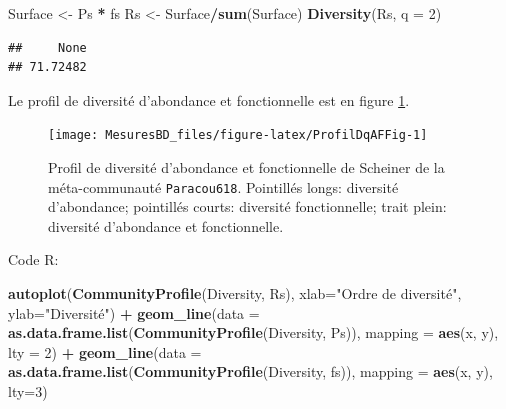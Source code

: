 \documentclass[
  11pt,
  french,
  a4paper,
  extrafontsizes,onecolumn,openright
  ]{memoir}
\newenvironment{Shaded}{\begin{snugshade}}{\end{snugshade}}
\newcommand{\DataTypeTok}[1]{\textcolor[rgb]{0.13,0.29,0.53}{#1}}
\newcommand{\DecValTok}[1]{\textcolor[rgb]{0.00,0.00,0.81}{#1}}
\newcommand{\KeywordTok}[1]{\textcolor[rgb]{0.13,0.29,0.53}{\textbf{#1}}}
\newcommand{\NormalTok}[1]{#1}
\newcommand{\OperatorTok}[1]{\textcolor[rgb]{0.81,0.36,0.00}{\textbf{#1}}}
\newcommand{\StringTok}[1]{\textcolor[rgb]{0.31,0.60,0.02}{#1}}
\newlength{\rf}
\begin{document}
\scriptsize

\begin{Shaded}
\begin{Highlighting}[]
\NormalTok{Surface <-}\StringTok{ }\NormalTok{Ps }\OperatorTok{*}\StringTok{ }\NormalTok{fs}
\NormalTok{Rs <-}\StringTok{ }\NormalTok{Surface}\OperatorTok{/}\KeywordTok{sum}\NormalTok{(Surface)}
\KeywordTok{Diversity}\NormalTok{(Rs, }\DataTypeTok{q =} \DecValTok{2}\NormalTok{)}
\end{Highlighting}
\end{Shaded}

\begin{verbatim}
##     None 
## 71.72482
\end{verbatim}

\normalsize

Le profil de diversité d'abondance et fonctionnelle est en figure \ref{fig:ProfilDqAFFig}.



\scriptsize

\begin{figure}

{\centering \texttt{[image: MesuresBD\_files/figure-latex/ProfilDqAFFig-1]} 

}

\caption{Profil de diversité d'abondance et fonctionnelle de Scheiner de la méta-communauté \texttt{Paracou618}. Pointillés longs: diversité d'abondance; pointillés courts: diversité fonctionnelle; trait plein: diversité d'abondance et fonctionnelle.}\label{fig:ProfilDqAFFig}
\end{figure}

\normalsize

Code R:

\scriptsize

\begin{Shaded}
\begin{Highlighting}[]
\KeywordTok{autoplot}\NormalTok{(}\KeywordTok{CommunityProfile}\NormalTok{(Diversity, Rs), }
         \DataTypeTok{xlab=}\StringTok{"Ordre de diversité"}\NormalTok{, }\DataTypeTok{ylab=}\StringTok{"Diversité"}\NormalTok{) }\OperatorTok{+}
\KeywordTok{geom_line}\NormalTok{(}\DataTypeTok{data =} \KeywordTok{as.data.frame.list}\NormalTok{(}\KeywordTok{CommunityProfile}\NormalTok{(Diversity, Ps)), }
          \DataTypeTok{mapping =} \KeywordTok{aes}\NormalTok{(x, y), }\DataTypeTok{lty =} \DecValTok{2}\NormalTok{) }\OperatorTok{+}
\KeywordTok{geom_line}\NormalTok{(}\DataTypeTok{data =} \KeywordTok{as.data.frame.list}\NormalTok{(}\KeywordTok{CommunityProfile}\NormalTok{(Diversity, fs)),}
          \DataTypeTok{mapping =} \KeywordTok{aes}\NormalTok{(x, y), }\DataTypeTok{lty=}\DecValTok{3}\NormalTok{)}
\end{Highlighting}
\end{Shaded}
\end{document}
